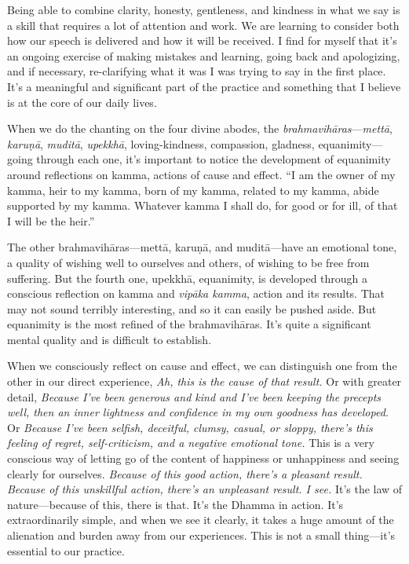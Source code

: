 Being able to combine clarity, honesty, gentleness, and kindness in 
what we say is a skill that requires a lot of attention and work. We 
are learning to consider both how our speech is delivered and how it 
will be received. I find for myself that it's an ongoing exercise of 
making mistakes and learning, going back and apologizing, and if 
necessary, re-clarifying what it was I was trying to say in the first 
place. It's a meaningful and significant part of the practice and 
something that I believe is at the core of our daily lives.


When we do the chanting on the four divine abodes, the 
\emph{brahmavihāras}---\emph{mettā}, \emph{karuṇā}, 
\emph{muditā}, \emph{upekkhā}, loving-kindness, compassion, gladness, 
equanimity---going through each one, it's important to notice the 
development of equanimity around reflections on kamma, actions of cause 
and effect. ``I am the owner of my kamma, heir to my kamma, born of my 
kamma, related to my kamma, abide supported by my kamma. Whatever kamma 
I shall do, for good or for ill, of that I will be the heir.''

The other brahmavihāras---mettā, karuṇā, and muditā---have an 
emotional tone, a quality of wishing well to ourselves and others, of 
wishing to be free from suffering. But the fourth one, upekkhā, 
equanimity, is developed through a conscious reflection on kamma and 
\emph{vipāka kamma}, action and its results. That may not sound 
terribly interesting, and so it can easily be pushed aside. But 
equanimity is the most refined of the brahmavihāras. It's quite a 
significant mental quality and is difficult to establish.

When we consciously reflect on cause and effect, we can distinguish one 
from the other in our direct experience, \emph{Ah, this is the cause of 
that result.} Or with greater detail, \emph{Because I've been generous 
and kind and I've been keeping the precepts well, then an inner 
lightness and confidence in my own goodness has developed.} Or 
\emph{Because I've been selfish, deceitful, clumsy, casual, or sloppy, 
there's this feeling of regret, self-criticism, and a negative 
emotional tone.} This is a very conscious way of letting go of the 
content of happiness or unhappiness and seeing clearly for ourselves. 
\emph{Because of this good action, there's a pleasant result. Because 
of this unskillful action, there's an unpleasant result. I see.} It's 
the law of nature---because of this, there is that. It's the Dhamma in 
action. It's extraordinarily simple, and when we see it clearly, it 
takes a huge amount of the alienation and burden away from our 
experiences. This is not a small thing---it's essential to our practice.

